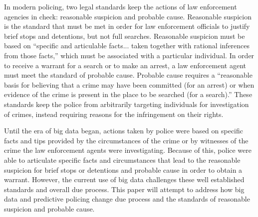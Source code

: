 \documentclass[12pt]{article} %
\begin{document}
In modern policing, two legal standards keep the actions of law enforcement agencies in check: reasonable suspicion and probable cause. Reasonable suspicion is the standard that must be met in order for law enforcement officials to justify brief stops and detentions, but not full searches. \cite{wex_suspicion} Reasonable suspicion must be based on ``specific and articulable facts... taken together with rational inferences from those facts,'' which must be associated with a particular individual. \cite{terry} In order to receive a warrant for a search or to make an arrest, a law enforcement agent must meet the standard of probable cause. Probable cause requires a ``reasonable basis for believing that a crime may have been committed (for an arrest) or when evidence of the crime is present in the place to be searched (for a search).'' \cite{wex_cause} These standards keep the police from arbitrarily targeting individuals for investigation of crimes, instead requiring reasons for the infringement on their rights.

Until the era of big data began, actions taken by police were based on specific facts and tips provided by the circumstances of the crime or by witnesses of the crime the law enforcement agents were investigating. Because of this, police were able to articulate specific facts and circumstances that lead to the reasonable suspicion for brief stops or detentions and probable cause in order to obtain a warrant. However, the current use of big data challenges these well established standards and overall due process. This paper will attempt to address how big data and predictive policing change due process and the standards of reasonable suspicion and probable cause. 









\end{document}
